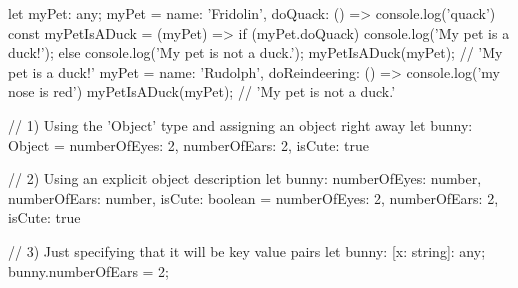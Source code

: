 
let myPet: any;
myPet = {
  name: 'Fridolin',
  doQuack: () => {console.log('quack')}
}
const myPetIsADuck = (myPet) => {
  if (myPet.doQuack) {
    console.log('My pet is a duck!');
  } else {
    console.log('My pet is not a duck.');
  }
}
myPetIsADuck(myPet); // 'My pet is a duck!'
myPet = {
  name: 'Rudolph',
  doReindeering: () => {console.log('my nose is red')}
}
myPetIsADuck(myPet); // 'My pet is not a duck.'




// 1) Using the 'Object' type and assigning an object right away
let bunny: Object = {
  numberOfEyes: 2,
  numberOfEars: 2,
  isCute: true
}

// 2) Using an explicit object description
let bunny: {
  numberOfEyes: number,
  numberOfEars: number,
  isCute: boolean
} = {
  numberOfEyes: 2,
  numberOfEars: 2,
  isCute: true
}

// 3) Just specifying that it will be key value pairs
let bunny: {[x: string]: any};
bunny.numberOfEars = 2;

